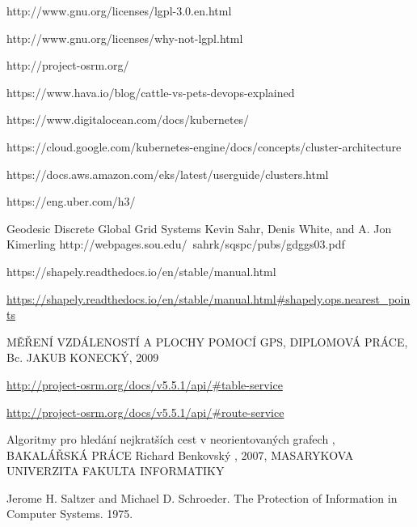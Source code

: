 \documentclass[thesis=M,czech]{FITthesis}[2019/12/23]
\theoremstyle{plain}
\theoremstyle{definition}
\begin{document}
\begin{thebibliography}{9}

http://www.gnu.org/licenses/lgpl-3.0.en.html



http://www.gnu.org/licenses/why-not-lgpl.html


http://project-osrm.org/


https://www.hava.io/blog/cattle-vs-pets-devops-explained



https://www.digitalocean.com/docs/kubernetes/


https://cloud.google.com/kubernetes-engine/docs/concepts/cluster-architecture


https://docs.aws.amazon.com/eks/latest/userguide/clusters.html



https://eng.uber.com/h3/



Geodesic Discrete Global Grid Systems
Kevin Sahr, Denis White, and A. Jon Kimerling
http://webpages.sou.edu/~sahrk/sqspc/pubs/gdggs03.pdf


https://shapely.readthedocs.io/en/stable/manual.html




\url{https://shapely.readthedocs.io/en/stable/manual.html#shapely.ops.nearest_points}


MĚŘENÍ VZDÁLENOSTÍ A PLOCHY POMOCÍ GPS, DIPLOMOVÁ PRÁCE,  Bc. JAKUB KONECKÝ, 2009



\url{http://project-osrm.org/docs/v5.5.1/api/#table-service}


\url{http://project-osrm.org/docs/v5.5.1/api/#route-service}



Algoritmy pro hledání nejkratších cest
v neorientovaných grafech , BAKALÁŘSKÁ PRÁCE
Richard Benkovský , 2007, MASARYKOVA UNIVERZITA
FAKULTA INFORMATIKY 


Jerome H. Saltzer and Michael D. Schroeder. The Protection of Information in
Computer Systems. 1975.



\end{thebibliography}
\end{document}
